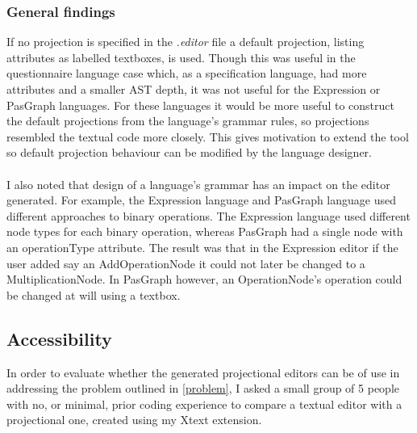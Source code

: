 \documentclass{article}
\begin{document}
{%

\subsubsection{General findings}
If no projection is specified in the \emph{.editor} file a default projection, listing attributes as labelled textboxes, is used. Though this was useful in the questionnaire language case which, as a specification language, had more attributes and a smaller AST depth, it was not useful for the Expression or PasGraph languages. For these languages it would be more useful to construct the default projections from the language's grammar rules, so projections resembled the textual code more closely. This gives motivation to extend the tool so default projection behaviour can be modified by the language designer.
\\
\\
I also noted that design of a language's grammar has an impact on the editor generated. For example, the Expression language and PasGraph language used different approaches to binary operations. The Expression language used different node types for each binary operation, whereas PasGraph had a single node with an operationType attribute. The result was that in the Expression editor if the user added say an AddOperationNode it could not later be changed to a MultiplicationNode. In PasGraph however, an OperationNode's operation could be changed at will using a textbox.

\subsection{Accessibility}\label{Accessibility}
In order to evaluate whether the generated projectional editors can be of use in addressing the problem outlined in \ref{problem}, I asked a small group of 5 people with no, or minimal, prior coding experience to compare a textual editor with a projectional one, created using my Xtext extension.

}
\end{document}
